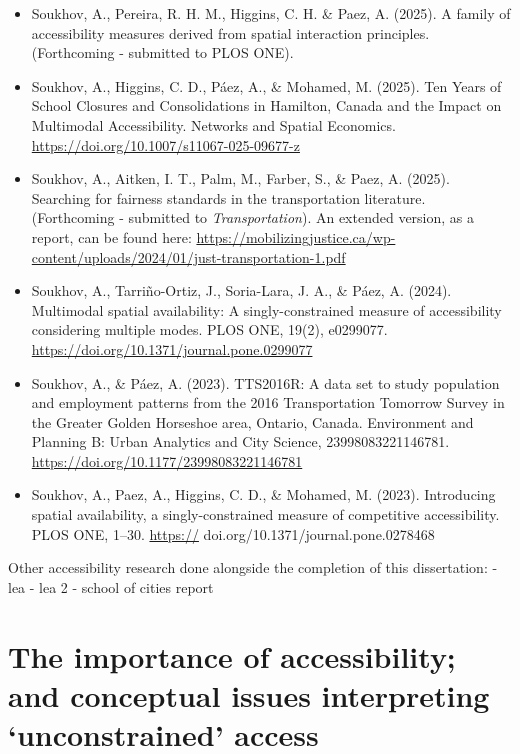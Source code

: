 \documentclass[
11pt, %
oneside, %
english, %
singlespacing, %
]{macthesis} %
\def\tightlist{}
\begin{document}
\begin{itemize}
\tightlist
\item
  Soukhov, A., Pereira, R. H. M., Higgins, C. H. \& Paez, A. (2025). A family of accessibility measures derived from spatial interaction principles. (Forthcoming - submitted to PLOS ONE).
\item
  Soukhov, A., Higgins, C. D., Páez, A., \& Mohamed, M. (2025). Ten Years of School Closures and Consolidations in Hamilton, Canada and the Impact on Multimodal Accessibility. Networks and Spatial Economics. \url{https://doi.org/10.1007/s11067-025-09677-z}
\item
  Soukhov, A., Aitken, I. T., Palm, M., Farber, S., \& Paez, A. (2025). Searching for fairness standards in the transportation literature. (Forthcoming - submitted to \emph{Transportation}). An extended version, as a report, can be found here: \url{https://mobilizingjustice.ca/wp-content/uploads/2024/01/just-transportation-1.pdf}
\item
  Soukhov, A., Tarriño-Ortiz, J., Soria-Lara, J. A., \& Páez, A. (2024). Multimodal spatial availability: A singly-constrained measure of accessibility considering multiple modes. PLOS ONE, 19(2), e0299077. \url{https://doi.org/10.1371/journal.pone.0299077}
\item
  Soukhov, A., \& Páez, A. (2023). TTS2016R: A data set to study population and employment patterns from the 2016 Transportation Tomorrow Survey in the Greater Golden Horseshoe area, Ontario, Canada. Environment and Planning B: Urban Analytics and City Science, 23998083221146781. \url{https://doi.org/10.1177/23998083221146781}
\item
  Soukhov, A., Paez, A., Higgins, C. D., \& Mohamed, M. (2023). Introducing spatial availability, a singly-constrained measure of competitive accessibility. PLOS ONE, 1--30. \url{https://} doi.org/10.1371/journal.pone.0278468
\end{itemize}

Other accessibility research done alongside the completion of this dissertation:
- lea
- lea 2
- school of cities report

\section{The importance of accessibility; and conceptual issues interpreting `unconstrained' access}\label{the-importance-of-accessibility-and-conceptual-issues-interpreting-unconstrained-access}
\end{document}
